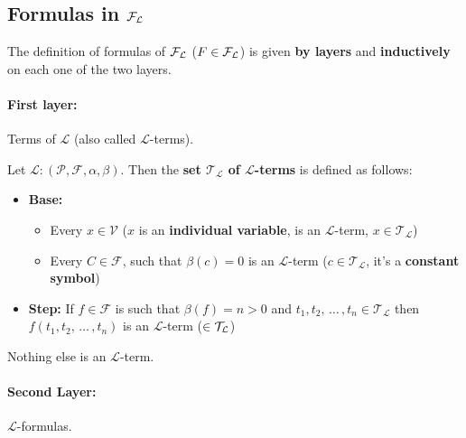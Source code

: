 \subsection{Formulas in $\mathcal{F}_\mathcal{L}$}
The definition of formulas of $\mathcal{F}_\mathcal{L}$ ($F \in \mathcal{F}_\mathcal{L}$) is given \textbf{by layers} and \textbf{inductively} on each one of the two layers.\\

\paragraph{First layer:} Terms of $\mathcal{L}$ (also called $\mathcal{L}$-terms).\\

\begin{definition}
	Let $\mathcal{L}: (\mathcal{P}, \mathcal{F}, \alpha, \beta)$. Then the \textbf{set $\mathcal{T}_\mathcal{L}$ of $\mathcal{L}$-terms} is defined as follows:
	\begin{itemize}
		\item \textbf{Base:}
		\begin{itemize}
			\item Every $x \in \mathcal{V}$ ($x$ is an \textbf{individual variable}, is an $\mathcal{L}$-term, $x \in \mathcal{T}_\mathcal{L}$)
			\item Every $C \in \mathcal{F}$, such that $\beta(c) =0$ is an $\mathcal{L}$-term ($c \in \mathcal{T}_\mathcal{L}$, it's a \textbf{constant symbol})
		\end{itemize} 
		\item \textbf{Step:} If $f \in \mathcal{F}$ is such that $\beta(f) = n > 0$ and $t_1, t_2, \, \dots \, , t_n \in \mathcal{T}_\mathcal{L}$ then $f(t_1, t_2, \, \dots \, , t_n)$ is an $\mathcal{L}$-term ($\in \mathcal{T}_\mathcal{L}$)
	\end{itemize} 
	Nothing else is an $\mathcal{L}$-term.\\
\end{definition}

\newpage

\paragraph{Second Layer:} $\mathcal{L}$-formulas.\\

